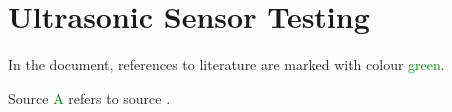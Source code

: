 \chapter{Ultrasonic Sensor Testing}
\label{ultrasonicSensorTesting}
In the document, references to literature are marked with colour \textcolor{green}{green}.


Source \textcolor{green}{A} refers to source \cite{???}. 




